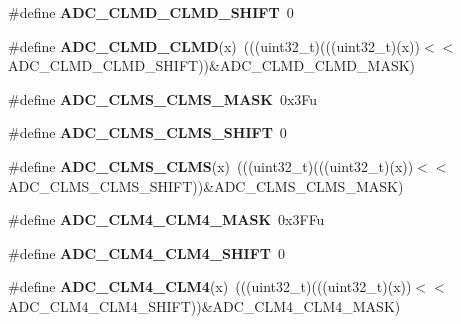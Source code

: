\begin{DoxyCompactItemize}
\mbox{\label{group___a_d_c___register___masks_ga872bf108b50c6dd439ddc1294f104fe5}} 
\#define {\bfseries A\+D\+C\+\_\+\+C\+L\+M\+D\+\_\+\+C\+L\+M\+D\+\_\+\+S\+H\+I\+FT}~0
\item 
\mbox{\label{group___a_d_c___register___masks_ga8066beb7ed493b4d9964fffd3cdefd7a}} 
\#define {\bfseries A\+D\+C\+\_\+\+C\+L\+M\+D\+\_\+\+C\+L\+MD}(x)~(((uint32\+\_\+t)(((uint32\+\_\+t)(x))$<$$<$A\+D\+C\+\_\+\+C\+L\+M\+D\+\_\+\+C\+L\+M\+D\+\_\+\+S\+H\+I\+FT))\&A\+D\+C\+\_\+\+C\+L\+M\+D\+\_\+\+C\+L\+M\+D\+\_\+\+M\+A\+SK)
\item 
\mbox{\label{group___a_d_c___register___masks_ga108adc09b24001dddfd498e14213fea6}} 
\#define {\bfseries A\+D\+C\+\_\+\+C\+L\+M\+S\+\_\+\+C\+L\+M\+S\+\_\+\+M\+A\+SK}~0x3\+Fu
\item 
\mbox{\label{group___a_d_c___register___masks_gabe0e92adb89c86d0523958a947288808}} 
\#define {\bfseries A\+D\+C\+\_\+\+C\+L\+M\+S\+\_\+\+C\+L\+M\+S\+\_\+\+S\+H\+I\+FT}~0
\item 
\mbox{\label{group___a_d_c___register___masks_ga83a90dcd2d54b25cc64ad18d6b9d4f07}} 
\#define {\bfseries A\+D\+C\+\_\+\+C\+L\+M\+S\+\_\+\+C\+L\+MS}(x)~(((uint32\+\_\+t)(((uint32\+\_\+t)(x))$<$$<$A\+D\+C\+\_\+\+C\+L\+M\+S\+\_\+\+C\+L\+M\+S\+\_\+\+S\+H\+I\+FT))\&A\+D\+C\+\_\+\+C\+L\+M\+S\+\_\+\+C\+L\+M\+S\+\_\+\+M\+A\+SK)
\item 
\mbox{\label{group___a_d_c___register___masks_ga9f8f5b63268c5b87f04ee884579a385b}} 
\#define {\bfseries A\+D\+C\+\_\+\+C\+L\+M4\+\_\+\+C\+L\+M4\+\_\+\+M\+A\+SK}~0x3\+F\+Fu
\item 
\mbox{\label{group___a_d_c___register___masks_gafa9121fc54ce9386fdc4c1d05f45d0de}} 
\#define {\bfseries A\+D\+C\+\_\+\+C\+L\+M4\+\_\+\+C\+L\+M4\+\_\+\+S\+H\+I\+FT}~0
\item 
\mbox{\label{group___a_d_c___register___masks_gad44edd7b22b26259838f02e5348e2449}} 
\#define {\bfseries A\+D\+C\+\_\+\+C\+L\+M4\+\_\+\+C\+L\+M4}(x)~(((uint32\+\_\+t)(((uint32\+\_\+t)(x))$<$$<$A\+D\+C\+\_\+\+C\+L\+M4\+\_\+\+C\+L\+M4\+\_\+\+S\+H\+I\+FT))\&A\+D\+C\+\_\+\+C\+L\+M4\+\_\+\+C\+L\+M4\+\_\+\+M\+A\+SK)
$$
\end{DoxyCompactItemize}
